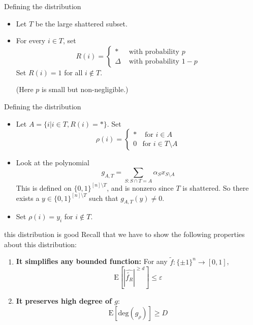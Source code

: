 \begin{frame}{Defining the distribution}
	
	\begin{itemize}
		\item<1-> Let $T$ be the large shattered subset.
		\item<2-> For every $i \in T$, set 
		$$
		R(i) = \begin{cases}
			* & \text{ with probability }p \\
			\Delta & \text{ with probability }1-p
		\end{cases}
		$$
		Set $R(i)=1$ for all $i \not \in T$.
		
	(Here $p$ is small but non-negligible.)
\end{itemize}\end{frame}
\begin{frame}{Defining the distribution}
	\begin{itemize}
	\item<1-> Let $A = \{i | i \in T, R(i)=*\}. $ Set 
	$$ \rho(i)= \begin{cases}
		* & \text{ for }i \in A \\
		0 & \text{for }i \in T \setminus A
	\end{cases}$$
	\item<2->
	Look at the polynomial
	$$ g_{A,T} = \displaystyle \sum_{S : S \cap T = A } \alpha_S x_{S \setminus A}$$
	This is defined on $\{0,1\}^{[n] \setminus T}$, and is nonzero since $T$ is shattered. So there exists a $y \in \{0,1\}^{[n] \setminus T}$ such that $g_{A,T}(y) \neq 0$. 
	\item<4-> Set $\rho(i)=y_i$ for $i \not \in T$.
	\end{itemize}
\end{frame}

\begin{frame}{this distribution is good}
	Recall that we have to show the following properties about this distribution:
	\begin{enumerate}
		\item<1-> \textbf{It simplifies any bounded function: }For any $\tilde{f}: \{ \pm 1\}^n \rightarrow [0,1]$,
		$$ \text{E} [|\hat{\tilde{f_R}}|^{\geq d}] \leq \varepsilon$$
		\item<2-> \textbf{It preserves high degree of $g$}:
		$$ \text{E}[\text{deg} (g_{\rho})] \geq D$$ 
	\end{enumerate}
	
\end{frame}


